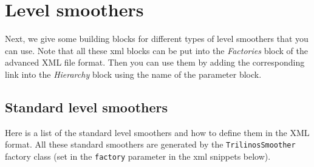 \documentclass[10pt,fleqn]{book}
\begin{document}
\section{Level smoothers}
\label{sec:advLevelSmoothers}
Next, we give some building blocks for different types of level smoothers that you can use. Note that all these xml blocks can be put into the \textit{Factories} block of the advanced \muelu XML file format. Then you can use them by adding the corresponding link into the \textit{Hierarchy} block using the name of the parameter block.

\subsection{Standard level smoothers}

Here is a list of the standard level smoothers and how to define them in the XML format. All these standard smoothers are generated by the \texttt{TrilinosSmoother} factory class (set in the \texttt{factory} parameter in the xml snippets below).
\end{document}
